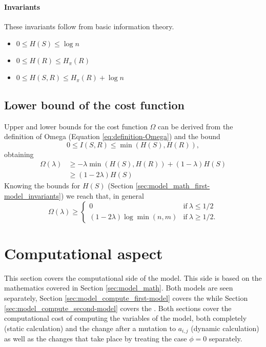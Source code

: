 \paragraph{Invariants} These invariants follow from basic information theory.
\cite{Cover1999}

\begin{itemize}
\item $0 \leq H(S) \leq \log n$
\item $0 \leq H(R) \leq H_\pi(R)$
\item $0 \leq H(S,R) \leq H_\pi(R) + \log n$
\end{itemize}

\subsection{Lower bound of the cost function}

Upper and lower bounds for the cost function $\Omega$ can be derived from the definition of Omega (Equation \eqref{eq:definition-Omega}) and the bound \cite{Cover1999}
\begin{equation*}
  0 \leq I(S,R) \leq \min(H(S),H(R)),
\end{equation*}
obtaining
\begin{align*}
  \Omega(\lambda) &\geq -\lambda \min(H(S),H(R)) + (1-\lambda) H(S) \\
                  &\geq (1-2\lambda)H(S)
\end{align*}
Knowing the bounds for $H(S)$ (Section \ref{sec:model_math_first-model_invariants}) we reach that, in general
\begin{equation}
  \label{eq:lower-bound-Omega}
  \Omega(\lambda) \geq
  \begin{cases}
    0                           & \text{if}~\lambda \leq 1/2 \\
    (1-2\lambda) \log \min(n,m) & \text{if}~\lambda \geq 1/2.
  \end{cases}
\end{equation}


\section{Computational aspect}
\label{sec:model_compute}

This section covers the computational side of the model.
This side is based on the mathematics covered in Section \ref{sec:model_math}.
Both models are seen separately, Section \ref{sec:model_compute_first-model} covers the \firstmodel{} while Section \ref{sec:model_compute_second-model} covers the \secondmodel{}.
Both sections cover the computational cost of computing the variables of the model, both completely (static calculation) and the change after a mutation to $a_{i,j}$ (dynamic calculation) as well as the changes that take place by treating the case $\phi=0$ separately.

